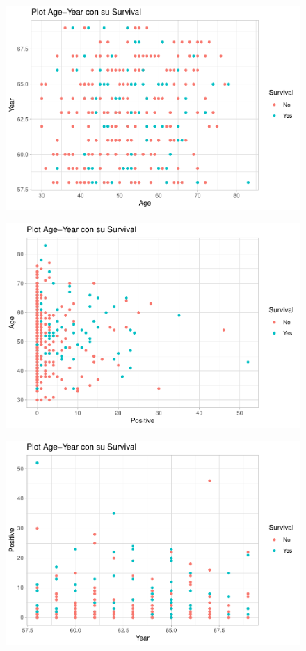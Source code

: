 \begin{figure}[H]\includegraphics[width=.9\linewidth]{img/EDA2_files/figure-latex/unnamed-chunk-29-1} \end{figure}

\begin{figure}[H]\includegraphics[width=.9\linewidth]{img/EDA2_files/figure-latex/unnamed-chunk-29-2} \end{figure}

\begin{figure}[H]\includegraphics[width=.9\linewidth]{img/EDA2_files/figure-latex/unnamed-chunk-29-3} \end{figure}

